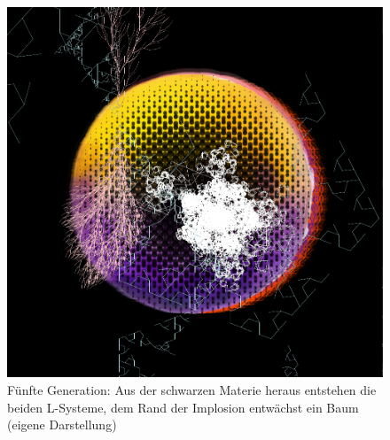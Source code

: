 \documentclass[../mciAusarbeitung.tex]{subfiles}
\begin{document}
\begin{figure}[H]
\includegraphics[width=\linewidth]{img/materia_farctal_veraestelung_ueberraschung_uebereinander_gen5.png}
\caption[Kooperation übereinander]{Fünfte Generation: Aus der schwarzen Materie heraus entstehen die beiden L-Systeme, dem Rand der Implosion entwächst ein Baum (eigene Darstellung)}
\label{materia_farctal_veraestelung_ueberraschung_uebereinander_gen5}
\end{figure}

%
%
\end{document}

